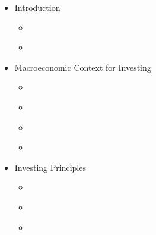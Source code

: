 \documentclass[letterpaper,10pt,english]{jupyterBook}
\begin{document}
\begin{itemize}
\item {} 
\sphinxAtStartPar
Introduction

\begin{itemize}
\item {} 
\sphinxAtStartPar
{\hyperref[\detokenize{ch/summary::doc}]{}}

\item {} 
\sphinxAtStartPar
{\hyperref[\detokenize{ch/references::doc}]{}}

\end{itemize}
\end{itemize}
\begin{itemize}
\item {} 
\sphinxAtStartPar
Macroeconomic Context for Investing

\begin{itemize}
\item {} 
\sphinxAtStartPar
{\hyperref[\detokenize{ch/actors::doc}]{}}

\item {} 
\sphinxAtStartPar
{\hyperref[\detokenize{ch/inflation::doc}]{}}

\item {} 
\sphinxAtStartPar
{\hyperref[\detokenize{code/notebooks/inflation::doc}]{}}

\item {} 
\sphinxAtStartPar
{\hyperref[\detokenize{ch/policy::doc}]{}}

\end{itemize}
\end{itemize}
\begin{itemize}
\item {} 
\sphinxAtStartPar
Investing Principles

\begin{itemize}
\item {} 
\sphinxAtStartPar
{\hyperref[\detokenize{ch/principles/intro_nb::doc}]{}}

\item {} 
\sphinxAtStartPar
{\hyperref[\detokenize{code/notebooks/rebalancing::doc}]{}}

\item {} 
\sphinxAtStartPar
{\hyperref[\detokenize{code/notebooks/sequence-risk::doc}]{}}

\end{itemize}
\end{itemize}
\end{document}
